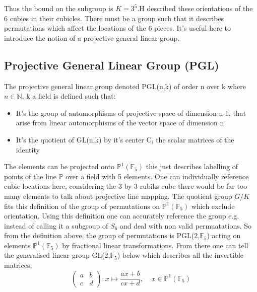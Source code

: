 \documentclass{article}
\newcounter{lem}[section]\setcounter{lem}{0}
\begin{document}
\begin{figure}[h]
\centering
  \TwoCubeSolved%
  \changecornerarrow
  \TwoRotation{\changecorner}
\end{figure}
Thus the bound on the subgroup is $K = 3^5$.\newline H described these orientations of the 6 cubies in their cubicles. There must be a group such that it describes permutations which affect the locations of the 6 pieces.
It's useful here to introduce the notion of a projective general linear group. 

\subsection*{Projective General Linear Group (PGL)}
The projective general linear group denoted PGL(n,k) of order n over k where $n \in \mathbb{N}$, k a field is defined such that:
\begin{itemize}
\item It's the group of automorphisms of projective space of dimension n-1, that arise from linear automorphisms of the vector space of dimension n
\item It's the quotient of GL(n,k) by it's center C, the scalar matrices of the identity
\end{itemize} 

The elements can be projected onto $\mathbb{P}^{1}(\mathbb{F}_5)$ this just describes labelling of points of the line $\mathbb{P}$ over a field with 5 elements. One can individually reference cubie locations here, considering the 3 by 3 rubiks cube there would be far too many elements to talk about projective line mapping. The quotient group $G/K$ fits this definition of the group of permutations on $\mathbb{P}^{1}(\mathbb{F}_5)$ which exclude orientation. Using this definition one can accurately reference the group e.g. instead of calling it a subgroup of $S_6$ and deal with non valid permuatations. So from the definition above, the group of permutations is PGL(2,$\mathbb{F}_5$) acting on elements $\mathbb{P}^{1}(\mathbb{F}_5)$ by fractional linear  transformations. From there one can tell the generalised linear group GL(2,$\mathbb{F}_5$) below which describes all the invertible matrices.
\begin{equation}
\begin{pmatrix} a & b \\ c & d \end{pmatrix} : x \mapsto \frac{ax + b}{cx + d},\ \ \ \ \ x \in \mathbb{P}^{1}(\mathbb{F}_5)
\end{equation}
\end{document}

